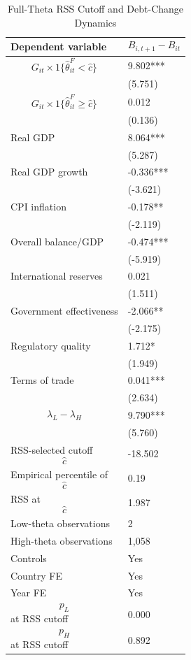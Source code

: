 \begin{table}[H]\centering
\begin{threeparttable}
\caption{Full-Theta RSS Cutoff and Debt-Change Dynamics}
\label{tab:deltaB_rss_cutoff_fulltheta}
\scriptsize
\begin{tabularx}{\textwidth}{lY}
\toprule
Dependent variable & $$B_{i,t+1}-B_{it}$$ \\
\midrule
$$G_{it}\times 1\{\widehat{\theta}^{F}_{it}<\widehat{c}\}$$ & 9.802*** \\
 & (5.751) \\
$$G_{it}\times 1\{\widehat{\theta}^{F}_{it}\geq\widehat{c}\}$$ & 0.012 \\
 & (0.136) \\
Real GDP & 8.064*** \\
 & (5.287) \\
Real GDP growth & -0.336*** \\
 & (-3.621) \\
CPI inflation & -0.178** \\
 & (-2.119) \\
Overall balance/GDP & -0.474*** \\
 & (-5.919) \\
International reserves & 0.021 \\
 & (1.511) \\
Government effectiveness & -2.066** \\
 & (-2.175) \\
Regulatory quality & 1.712* \\
 & (1.949) \\
Terms of trade & 0.041*** \\
 & (2.634) \\
$$\lambda_L-\lambda_H$$ & 9.790*** \\
 & (5.760) \\
\midrule
RSS-selected cutoff $$\widehat{c}$$ & -18.502 \\
Empirical percentile of $$\widehat{c}$$ & 0.19 \\
RSS at $$\widehat{c}$$ & 1.987 \\
Low-theta observations & 2 \\
High-theta observations & 1,058 \\
Controls & Yes \\
Country FE & Yes \\
Year FE & Yes \\
$$p_L$$ at RSS cutoff & 0.000 \\
$$p_H$$ at RSS cutoff & 0.892 \\

\end{tabularx}
\end{threeparttable}
\end{table}
